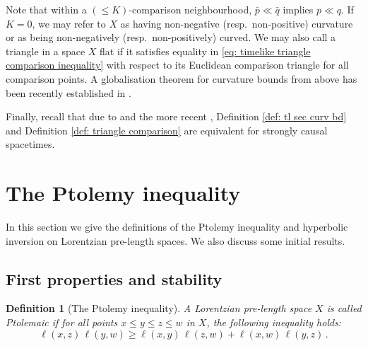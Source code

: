 \documentclass[hidelinks,12pt,a4paper]{article}
\numberwithin{equation}{section}
\theoremstyle{plain}
\newtheorem{definition}{Definition}[section]
\theoremstyle{definition}
\newcommand{\LpLS}{Lo\-rentz\-ian pre-length space }
\newcommand{\LpLSsn}{Lo\-rentz\-ian pre-length spaces}
\begin{document}
Note that within a $(\leq K)$-comparison neighbourhood, $\bar{p} \ll \bar{q}$ implies $p \ll q$. 
If $K=0$, we may refer to $X$ as having non-negative (resp.\ non-positive) curvature or as being non-negatively (resp.\ non-positively) curved. 
We may also call a triangle in a space $X$ flat if it satisfies equality in \eqref{eq: timelike triangle comparison inequality} with respect to its Euclidean comparison triangle for all comparison points. 
A globalisation theorem for curvature bounds from above has been recently established in \cite{EG25+}. 

Finally, recall that due to \cite{Harris} and the more recent \cite[Theorems 3.1 \& 3.2]{BKOR25}, Definition \ref{def: tl sec curv bd} and Definition \ref{def: triangle comparison} are equivalent for strongly causal spacetimes.

\section{The Ptolemy inequality}

In this section we give the definitions of the Ptolemy inequality and hyperbolic inversion on \LpLSsn. 
We also discuss some initial results.

\subsection{First properties and stability}

\begin{definition}[The Ptolemy inequality] \label{def: Ptolemy def}
A \LpLS $X$ is called Ptolemaic if for all points $x \leq y \leq z \leq w$ in $X$, the following inequality holds: 
\begin{equation} 
\label{eq: Ptolemy}
\ell(x,z) \, \ell(y,w) \geq \ell(x,y) \, \ell(z,w) + \ell(x,w) \, \ell(y,z) \, .
\end{equation}
\end{definition}

\end{document}

